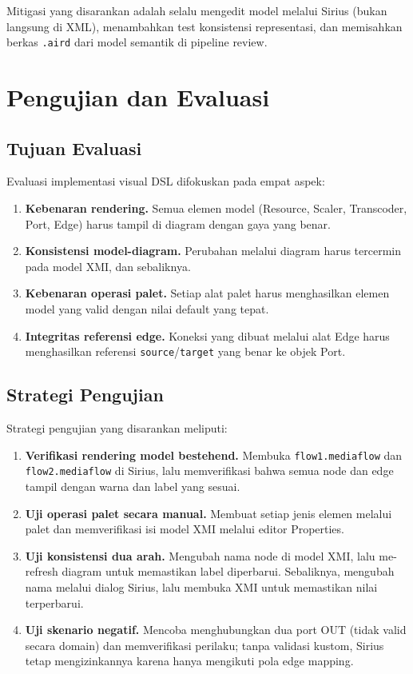 Mitigasi yang disarankan adalah selalu mengedit model melalui Sirius (bukan langsung di XML), menambahkan test konsistensi representasi, dan memisahkan berkas \texttt{.aird} dari model semantik di pipeline review.

\section{Pengujian dan Evaluasi}

\subsection{Tujuan Evaluasi}

Evaluasi implementasi visual DSL difokuskan pada empat aspek:
\begin{enumerate}
  \item \textbf{Kebenaran rendering.} Semua elemen model (Resource, Scaler, Transcoder, Port, Edge) harus tampil di diagram dengan gaya yang benar.
  \item \textbf{Konsistensi model-diagram.} Perubahan melalui diagram harus tercermin pada model XMI, dan sebaliknya.
  \item \textbf{Kebenaran operasi palet.} Setiap alat palet harus menghasilkan elemen model yang valid dengan nilai default yang tepat.
  \item \textbf{Integritas referensi edge.} Koneksi yang dibuat melalui alat Edge harus menghasilkan referensi \texttt{source}/\texttt{target} yang benar ke objek Port.
\end{enumerate}

\subsection{Strategi Pengujian}

Strategi pengujian yang disarankan meliputi:
\begin{enumerate}
  \item \textbf{Verifikasi rendering model bestehend.} Membuka \texttt{flow1.mediaflow} dan \texttt{flow2.mediaflow} di Sirius, lalu memverifikasi bahwa semua node dan edge tampil dengan warna dan label yang sesuai.
  \item \textbf{Uji operasi palet secara manual.} Membuat setiap jenis elemen melalui palet dan memverifikasi isi model XMI melalui editor Properties.
  \item \textbf{Uji konsistensi dua arah.} Mengubah nama node di model XMI, lalu me-refresh diagram untuk memastikan label diperbarui. Sebaliknya, mengubah nama melalui dialog Sirius, lalu membuka XMI untuk memastikan nilai terperbarui.
  \item \textbf{Uji skenario negatif.} Mencoba menghubungkan dua port OUT (tidak valid secara domain) dan memverifikasi perilaku; tanpa validasi kustom, Sirius tetap mengizinkannya karena hanya mengikuti pola edge mapping.
\end{enumerate}

